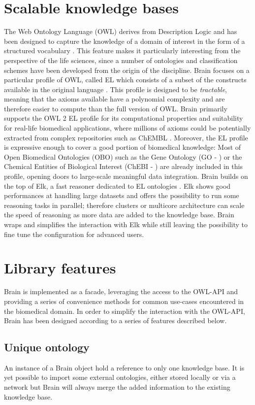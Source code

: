 \documentclass{bioinfo}
\begin{document}
\section{Scalable knowledge bases}
The Web Ontology Language (OWL) derives from Description Logic and
has been designed to capture the knowledge of a domain of interest in the form of a structured vocabulary \citep{W3COWLWorkingGroup}.
This feature makes it particularly
interesting from the perspective of the life sciences, since a number of ontologies and classification schemes
have been developed from the origin of
the discipline. Brain focuses on a particular profile of OWL, called EL
which consists of a subset of the constructs available in the original language \citep{Motik2009}. This profile is
designed to be \emph{tractable}, meaning that the axioms available have a polynomial complexity
and are therefore easier to compute than the full version of OWL.
Brain primarily supports the OWL 2 EL profile for its computational properties and suitability for real-life biomedical applications,
where millions of axioms could be potentially extracted from complex repositories such as ChEMBL \citep{Gaulton2012}.
Moreover, the EL profile is expressive enough to cover a good portion of biomedical knowledge: Most of Open Biomedical Ontologies (OBO)
such as the Gene Ontology (GO - \citealp{Ashburner2000}) or
the Chemical Entities of Biological Interest (ChEBI - \citealp{DeMatos2010}) are already included in this
profile, opening doors to large-scale meaningful data integration.
Brain builds on the top of Elk, a fast reasoner dedicated to EL ontologies \citep{YevgenyKazakov2011}. Elk shows good
performances at handling
large datasets and offers the possibility to run some reasoning tasks in parallel; therefore
clusters or multicore architecture can scale the speed of reasoning as more data are added to the knowledge base.
Brain wraps and simplifies the interaction with Elk while still leaving the possibility to fine tune
the configuration for advanced users.

\section{Library features}
Brain is implemented as a facade, leveraging the access to the OWL-API and providing a series of convenience methods for common
use-cases encountered in the biomedical domain. In order to simplify the interaction with the OWL-API, Brain has been designed according to
a series of features described below.
\subsection{Unique ontology}
An instance of a Brain object hold a reference to only one knowledge base. It is yet possible to import some external ontologies, either
stored locally or via a network but Brain will always merge the added information to the existing knowledge base.
\end{document}
